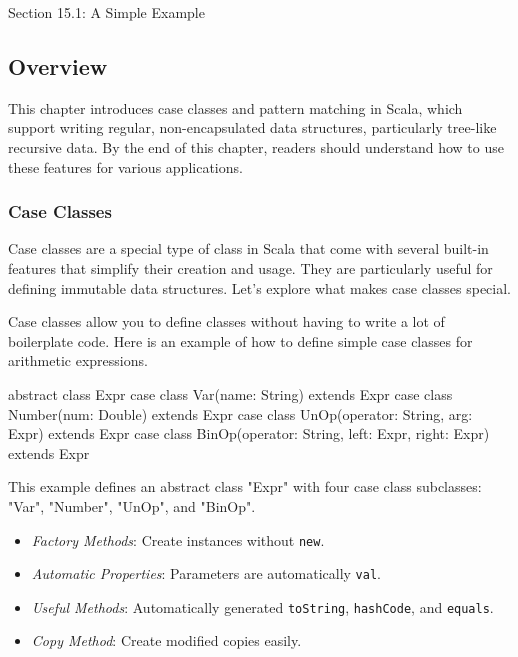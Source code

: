 \begin{notes}{Section 15.1: A Simple Example}
    \subsection*{Overview}

    This chapter introduces case classes and pattern matching in Scala, which support writing regular, non-encapsulated data structures, particularly tree-like recursive data. By the end of this 
    chapter, readers should understand how to use these features for various applications.
    
    \subsubsection*{Case Classes}
    
    Case classes are a special type of class in Scala that come with several built-in features that simplify their creation and usage. They are particularly useful for defining immutable data structures. 
    Let's explore what makes case classes special.
    
    \begin{highlight}
    
    Case classes allow you to define classes without having to write a lot of boilerplate code. Here is an example of how to define simple case classes for arithmetic expressions.
    
    \begin{code}[Scala]
    abstract class Expr
    case class Var(name: String) extends Expr
    case class Number(num: Double) extends Expr
    case class UnOp(operator: String, arg: Expr) extends Expr
    case class BinOp(operator: String, left: Expr, right: Expr) extends Expr
    \end{code}
    
    This example defines an abstract class "Expr" with four case class subclasses: "Var", "Number", "UnOp", and "BinOp".
    
    \begin{itemize}
        \item \textit{Factory Methods}: Create instances without \texttt{new}.
        \item \textit{Automatic Properties}: Parameters are automatically \texttt{val}.
        \item \textit{Useful Methods}: Automatically generated \texttt{toString}, \texttt{hashCode}, and \texttt{equals}.
        \item \textit{Copy Method}: Create modified copies easily.
    \end{itemize}
    

\end{highlight}
\end{notes}
